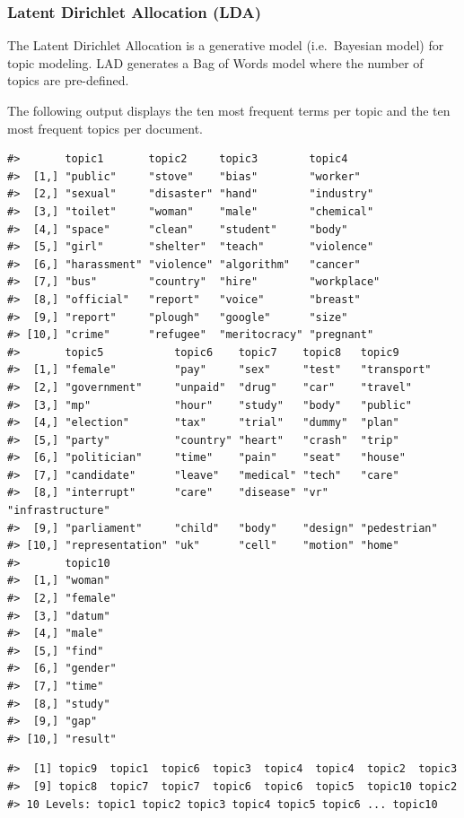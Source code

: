 \documentclass[
]{article}
\begin{document}
\hypertarget{latent-dirichlet-allocation-lda}{%
\subsubsection{Latent Dirichlet Allocation
(LDA)}\label{latent-dirichlet-allocation-lda}}

The Latent Dirichlet Allocation is a generative model (i.e.~Bayesian
model) for topic modeling. LAD generates a Bag of Words model where the
number of topics are pre-defined.

The following output displays the ten most frequent terms per topic and
the ten most frequent topics per document.

\begin{verbatim}
#>       topic1       topic2     topic3        topic4     
#>  [1,] "public"     "stove"    "bias"        "worker"   
#>  [2,] "sexual"     "disaster" "hand"        "industry" 
#>  [3,] "toilet"     "woman"    "male"        "chemical" 
#>  [4,] "space"      "clean"    "student"     "body"     
#>  [5,] "girl"       "shelter"  "teach"       "violence" 
#>  [6,] "harassment" "violence" "algorithm"   "cancer"   
#>  [7,] "bus"        "country"  "hire"        "workplace"
#>  [8,] "official"   "report"   "voice"       "breast"   
#>  [9,] "report"     "plough"   "google"      "size"     
#> [10,] "crime"      "refugee"  "meritocracy" "pregnant" 
#>       topic5           topic6    topic7    topic8   topic9          
#>  [1,] "female"         "pay"     "sex"     "test"   "transport"     
#>  [2,] "government"     "unpaid"  "drug"    "car"    "travel"        
#>  [3,] "mp"             "hour"    "study"   "body"   "public"        
#>  [4,] "election"       "tax"     "trial"   "dummy"  "plan"          
#>  [5,] "party"          "country" "heart"   "crash"  "trip"          
#>  [6,] "politician"     "time"    "pain"    "seat"   "house"         
#>  [7,] "candidate"      "leave"   "medical" "tech"   "care"          
#>  [8,] "interrupt"      "care"    "disease" "vr"     "infrastructure"
#>  [9,] "parliament"     "child"   "body"    "design" "pedestrian"    
#> [10,] "representation" "uk"      "cell"    "motion" "home"          
#>       topic10 
#>  [1,] "woman" 
#>  [2,] "female"
#>  [3,] "datum" 
#>  [4,] "male"  
#>  [5,] "find"  
#>  [6,] "gender"
#>  [7,] "time"  
#>  [8,] "study" 
#>  [9,] "gap"   
#> [10,] "result"
\end{verbatim}

\begin{verbatim}
#>  [1] topic9  topic1  topic6  topic3  topic4  topic4  topic2  topic3 
#>  [9] topic8  topic7  topic7  topic6  topic6  topic5  topic10 topic2 
#> 10 Levels: topic1 topic2 topic3 topic4 topic5 topic6 ... topic10
\end{verbatim}
\end{document}
